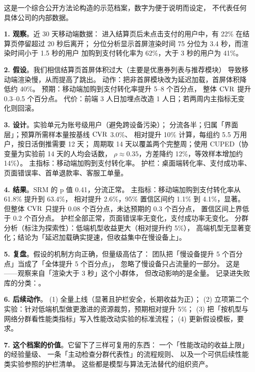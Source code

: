 \begin{casebox}
这是一个综合公开方法论构造的示范档案，数字为便于说明而设定，
不代表任何具体公司的内部数据。

\textbf{1. 观察}。近 30 天移动端数据：
进入结算页后未点击支付的用户中，有 22\% 在结算页停留超过 20 秒后离开；
分位分析显示首屏渲染时间 75 分位为 3.4 秒，而渲染时间小于 1.5 秒的用户
加购到支付转化率为 62\%，大于 3 秒的用户为 41\%。

\textbf{2. 假设}。我们相信结算页首屏体积过大（主要是优惠券列表与推荐模块）
导致移动端渲染慢，从而提高了跳出。
动作：把非首屏模块改为延迟加载，首屏体积降低约 40\%。
预期：移动端加购到支付转化率提升 5--8 个百分点，
整体 $\operatorname{CVR}$ 提升 0.3--0.5 个百分点。
代价：前端 3 人日加埋点改造 1 人日；若两周内主指标无变化则回滚。

\textbf{3. 设计}。实验单元为账号级用户（避免跨设备污染）；
分流各半；归属「界面层」；预算所需样本量按基线 $\operatorname{CVR}$ 3.0\%、
相对提升 10\% 计算，每组约 5.5 万用户，按日活倒推需要 12 天；
周期取 14 天以覆盖两个完整周；使用 CUPED（协变量为实验前 14 天的人均会话数，
$\rho \approx 0.35$，方差降约 12\%，等效样本增加约 14\%）。
主指标：移动端加购到支付转化率。
护栏：桌面端转化率、支付成功率、页面错误率、首单退款率、客服工单量。

\textbf{4. 结果}。SRM 的 p 值 0.41，分流正常。
主指标：移动端加购到支付转化率从 61.8\% 提升到 63.4\%，
相对提升 2.6\%，95\% 置信区间约 1.1\% 到 4.1\%，显著。
但整体 $\operatorname{CVR}$ 只提升 0.08 个百分点，未达预期的 0.3 个百分点，
置信区间上界低于 0.2 个百分点。
护栏全部正常，页面错误率无变化，支付成功率无变化。
分群分析（标注为探索性）：低端机型收益更大（相对提升约 5\%），
高端机型无显著变化；结论为「延迟加载确实提速，但收益集中在慢设备上」。

\textbf{5. 复盘}。假设的机制方向正确，但量级高估了：
团队把「慢设备提升 5 个百分点」当成了「全体提升 5 个百分点」，
忽略了慢设备只占流量的一部分。
这是——观察来自「渲染大于 3 秒」这个小群体，
但改动影响的是全量。
记录进失败库的分类：。

\textbf{6. 后续动作}。
(1) 全量上线（显著且护栏安全，长期收益为正）；
(2) 立项第二个实验：针对低端机型做更激进的资源裁剪，预期相对提升 5\%；
(3) 把「按机型与网络分群看性能类指标」写入性能改动实验的标准流程；
(4) 更新假设模板，要求。

\textbf{7. 这个档案的价值}。它留下了三样可复用的东西：
一个「性能改动的收益上限」的经验量级、
一条「主动检查分群代表性」的流程规则、
以及一个可供后续性能类实验参照的护栏清单。
这些都是模型与算法无法替代的组织资产。
\end{casebox}


